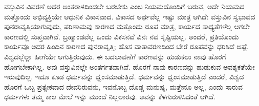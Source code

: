 ವಸ್ತುವಿನ ವಿವರಣೆ ಅದರ ಅಂತರಾಳದಿಂದಲೇ ಬರಬೇಕು ಎಂಬ ನಿಯಮದೊಂದಿಗೆ ಬರುವ, ಅದೇ ನಿಯಮದ ಮತ್ತೊಂದು ಅಭಿವ್ಯಕ್ತಿಯೇ ಆಧುನಿಕ ವಿಕಾಸವಾದ. ವಿಕಾಸದ ಅರ್ಥವೆಲ್ಲ ಇಷ್ಟು ಮಾತ್ರ ಆಗಿದೆ: ವಸ್ತುವಿನ ಸ್ವಭಾವದ ಪುನರಾವೃತ್ತಿಯಾಗುವುದು, ಪರಿಣಾಮವು ಕಾರಣದ ಮತ್ತೊಂದು ರೂಪ ಮಾತ್ರ, ಕಾರ್ಯದ ಸಾಧ್ಯತೆಗಳೆಲ್ಲ ಆಗಲೇ ಕಾರಣದಲ್ಲಿ ಸುಪ್ತವಾಗಿವೆ. ಬ್ರಹ್ಮಾಂಡವೆಲ್ಲ ಒಂದು ವಿಕಸನವೆ ವಿನಃ ನವ ಸೃಷ್ಟಿಯಲ್ಲ. ಅಂದರೆ, ಪ್ರತಿಯೊಂದು ಕಾರ್ಯವೂ ಅದರ ಹಿಂದಿನ ಕಾರಣದ ಪುನರಾವೃತ್ತಿ; ಹೊಸ ವಾತಾವರಣದಿಂದ ಬೇರೆ ರೂಪವನ್ನು ಧರಿಸಿದೆ ಅಷ್ಟೆ. ವಿಶ್ವದಲ್ಲೆಲ್ಲಾ ಹೀಗೆಯೇ ಆಗುತ್ತಿರುವುದು. ಈ ಬದಲಾವಣೆಗೆ ಕಾರಣವನ್ನು ಹುಡುಕಲು ನಾವು ಹೊರಗೆ ಹೋಗಬೇಕಾಗಿಲ್ಲ. ಅವು ವಸ್ತುವಿನಲ್ಲೇ ಅಂತರ್ಗತವಾಗಿವೆ. ಹೊರಗೆ ನಾವು ಕಾರಣವನ್ನು ಹುಡುಕುವ ಅವಶ್ಯಕತೆಯೇ ಇರುವುದಿಲ್ಲ. ಇದೂ ಕೂಡ ಧರ್ಮವನ್ನು ಧ್ವಂಸಮಾಡುತ್ತಿದೆ. ಧರ್ಮವನ್ನು ಧ್ವಂಸಮಾಡುತ್ತಿದೆ ಎಂದರೆ, ವಿಶ್ವದ ಹೊರಗೆ ಒಬ್ಬ ಪ್ರತ್ಯೇಕವಾದ ದೇವರಿರುವನು, ಇವನೊಬ್ಬ ದೊಡ್ಡ ಮನುಷ್ಯ, ಮತ್ತೇನೂ ಅಲ್ಲ, ಎಂದು ಸಾರುವ ಧರ್ಮಗಳು ತಮ್ಮ ಕಾಲ ಮೇಲೆ ಇನ್ನು ಮುಂದೆ ನಿಲ್ಲಲಾರವು. ಅವನ್ನು ಕೆಳಗುರುಳಿಸಿದಂತೆ ಆಗಿದೆ.

